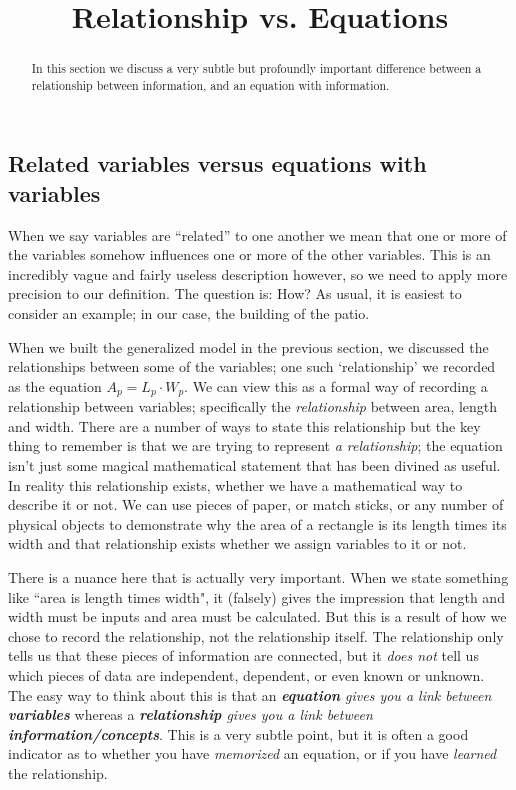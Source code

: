 \documentclass{ximeraXloud}
\title{Relationship vs. Equations}
\begin{document}
\begin{abstract}
    In this section we discuss a very subtle but profoundly important difference between a relationship between information, and an equation with information.
\end{abstract}
\maketitle

\subsection*{Related variables versus equations with variables}
    When we say variables are ``related'' to one another we mean that one or more of the variables somehow influences one or more of the other variables. This is an incredibly vague and fairly useless description however, so we need to apply more precision to our definition. The question is: How? As usual, it is easiest to consider an example; in our case, the building of the patio. 
    
    When we built the generalized model in the previous section, we discussed the relationships between some of the variables; one such `relationship' we recorded as the equation $A_p = L_p \cdot W_p$. We can view this as a formal way of recording a relationship between variables; specifically the \textit{relationship} between area, length and width. There are a number of ways to state this relationship but the key thing to remember is that we are trying to represent \textit{a relationship}; the equation isn't just some magical mathematical statement that has been divined as useful. In reality this relationship exists, whether we have a mathematical way to describe it or not. We can use pieces of paper, or match sticks, or any number of physical objects to demonstrate why the area of a rectangle is its length times its width and that relationship exists whether we assign variables to it or not.
    
    There is a nuance here that is actually very important. When we state something like ``area is length times width", it (falsely) gives the impression that length and width must be inputs and area must be calculated. But this is a result of how we chose to record the relationship, not the relationship itself.  The relationship only tells us that these pieces of information are connected, but it \textit{does not} tell us which pieces of data are independent, dependent, or even known or unknown. The easy way to think about this is that an \textit{\textbf{equation} gives you a link between \textbf{variables}} whereas a \textit{\textbf{relationship} gives you a link between \textbf{information/concepts}}. This is a very subtle point, but it is often a good indicator as to whether you have \textit{memorized} an equation, or if you have \textit{learned} the relationship.
\end{document}
